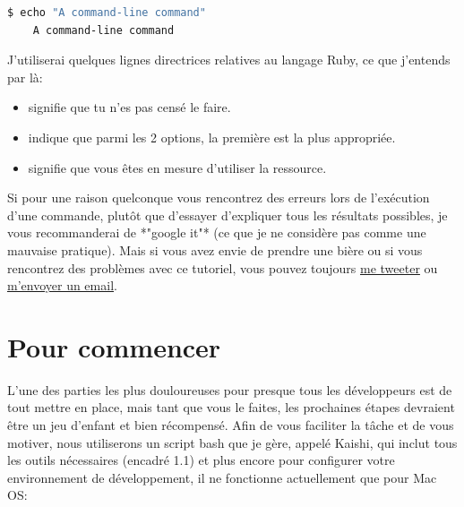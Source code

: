 \documentclass[]{report}
\begin{document}
    \begin{scriptsize}
    \begin{lstlisting}[language=bash]
    $ echo "A command-line command"
    A command-line command
    \end{lstlisting}
    \end{scriptsize}

    J'utiliserai quelques lignes directrices relatives au langage Ruby, ce que j'entends par là:

    \begin{itemize}
      \item {} signifie que tu n'es pas censé le faire.
      \item {} indique que parmi les 2 options, la première est la plus appropriée.
      \item {} signifie que vous êtes en mesure d'utiliser la ressource.
    \end{itemize}

    Si pour une raison quelconque vous rencontrez des erreurs lors de l'exécution d'une commande, plutôt que d'essayer d'expliquer tous les résultats possibles, je vous recommanderai de *"google it"* (ce que je ne considère pas comme une mauvaise pratique). Mais si vous avez envie de prendre une bière ou si vous rencontrez des problèmes avec ce tutoriel, vous pouvez toujours \href{http://twitter.com/kurenn}{me tweeter} ou \href{mailto:kurenn@icalialabs.com}{m'envoyer un email}.

  \section{Pour commencer}

    L'une des parties les plus douloureuses pour presque tous les développeurs est de tout mettre en place, mais tant que vous le faites, les prochaines étapes devraient être un jeu d'enfant et bien récompensé. Afin de vous faciliter la tâche et de vous motiver, nous utiliserons un script bash que je gère, appelé Kaishi, qui inclut tous les outils nécessaires (encadré 1.1) et plus encore pour configurer votre environnement de développement, il ne fonctionne actuellement que pour Mac OS:
\end{document}
